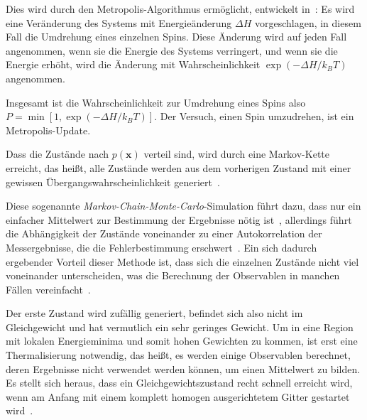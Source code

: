 	Dies wird durch den Metropolis-Algorithmus ermöglicht, entwickelt in~\cite{metropolisupdate}:
	Es wird eine Veränderung des Systems mit Energieänderung $\Delta H$ vorgeschlagen, in diesem Fall die Umdrehung eines einzelnen Spins. Diese Änderung wird auf jeden Fall angenommen, wenn sie die Energie des Systems verringert, und wenn sie die Energie erhöht, wird die Änderung mit Wahrscheinlichkeit $\exp(-\Delta H/k_BT)$ angenommen.
	
	Insgesamt ist die Wahrscheinlichkeit zur Umdrehung eines Spins also $P=\min \left[1, \exp(-\Delta H/k_BT)\right]$. Der Versuch, einen Spin umzudrehen, ist ein Metropolis-Update.
	
	Dass die Zustände nach $p(\mathbf{x})$ verteil sind, wird durch eine Markov-Kette erreicht, das heißt, alle Zustände werden aus dem vorherigen Zustand mit einer gewissen Übergangswahrscheinlichkeit generiert~\cite[vgl. ][S. 19 f.]{binderheermann}. 
	
	Diese sogenannte \textit{Markov-Chain-Monte-Carlo}-Simulation führt dazu, dass nur ein einfacher Mittelwert zur Bestimmung der Ergebnisse nötig ist~\cite[vgl. ][S. 19 f.]{binderheermann}, allerdings führt die Abhängigkeit der Zustände voneinander zu einer Autokorrelation der Messergebnisse, die die Fehlerbestimmung erschwert~\cite[vgl. ][S. 72 ff.]{skriptcompphys}. Ein sich dadurch ergebender Vorteil dieser Methode ist, dass sich die einzelnen Zustände nicht viel voneinander unterscheiden, was die Berechnung der Observablen in manchen Fällen vereinfacht~\cite[vgl. ][S. 102 f.]{binderheermann}.
	
	Der erste Zustand wird zufällig generiert, befindet sich also nicht im Gleichgewicht und hat vermutlich ein sehr geringes Gewicht. Um in eine Region mit lokalen Energieminima und somit hohen Gewichten zu kommen, ist erst eine Thermalisierung notwendig, das heißt, es werden einige Observablen berechnet, deren Ergebnisse nicht verwendet werden können, um einen Mittelwert zu bilden. %
	Es stellt sich heraus, dass ein Gleichgewichtszustand recht schnell erreicht wird, wenn am Anfang mit einem komplett homogen ausgerichtetem Gitter gestartet wird~\cite[vgl. ][S. 100 f.]{binderheermann}.
	

